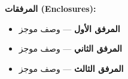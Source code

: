 \documentclass[12pt,a4paper]{article}
\begin{document}
\vspace{0.5em}

\begin{flushright}
\textbf{المرفقات (Enclosures):}\\[0.2em]
\begin{itemize}[leftmargin=2em,rightmargin=0pt,nosep,itemsep=0.2em]
  \item \textbf{المرفق الأول} --- وصف موجز
  \item \textbf{المرفق الثاني} --- وصف موجز
  \item \textbf{المرفق الثالث} --- وصف موجز
\end{itemize}
\end{flushright}
\end{document}
